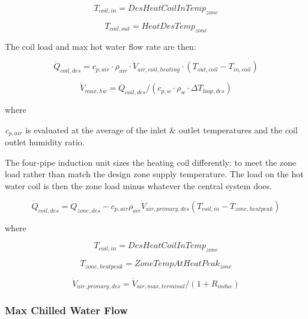 \begin{equation}
{T_{coil,in}} = DesHeatCoilInTem{p_{zone}}
\end{equation}

\begin{equation}
{T_{coil,out}} = HeatDesTem{p_{zone}}
\end{equation}

The coil load and max hot water flow rate are then:

\begin{equation}
  \dot Q_{coil,des} = c_{p,air}\cdot \rho_{air}\cdot \dot V_{air,coil,heating}\cdot (T_{out,coil} - T_{in,coil})
\end{equation}

\begin{equation}
  \dot V_{max,hw} = \dot Q_{coil,des}/(c_{p,w}\cdot \rho_{w}\cdot \Delta T_{loop,des})
\end{equation}

where

\emph{c\(_{p,air}\)} is evaluated at the average of the inlet \& outlet temperatures and the coil outlet humidity ratio.

The four-pipe induction unit sizes the heating coil differently: to meet the zone load rather than match the design zone supply temperature. The load on the hot water coil is then the zone load minus whatever the central system does.

\begin{equation}
{\dot Q_{coil,des}} = {\dot Q_{zone,des}} - {c_{p,air}}{\rho_{air}}{\dot V_{air,primary,des}}({T_{coil,in}} - {T_{zone,heatpeak}})
\end{equation}

where

\begin{equation}
{T_{coil,in}} = DesHeatCoilInTem{p_{zone}}
\end{equation}

\begin{equation}
{T_{zone,heatpeak}} = ZoneTempAtHeatPea{k_{zone}}
\end{equation}

\begin{equation}
{\dot V_{air,primary,des}} = {\dot V_{air,max,terminal}}/(1 + {R_{induc}})
\end{equation}

\subsubsection{Max Chilled Water Flow}\label{max-chilled-water-flow}

